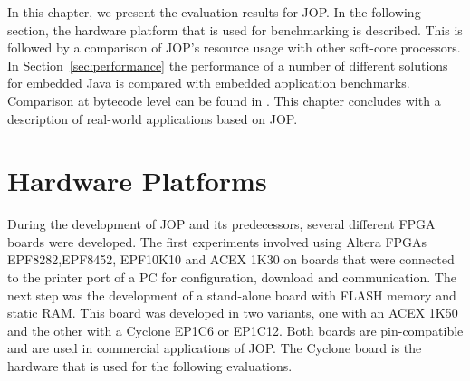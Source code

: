 
In this chapter, we present the evaluation results for JOP. In the
following section, the hardware platform that is used for
benchmarking is described. This is followed by a comparison of JOP's
resource usage with other soft-core processors. In
Section~\ref{sec:performance} the performance of a number of
different solutions for embedded Java is compared with embedded
application benchmarks. Comparison at bytecode level can be found in
\cite{jop:austrochip05}. This chapter concludes with a description of
real-world applications based on JOP.

\section{Hardware Platforms}

During the development of JOP and its predecessors, several
different FPGA boards were developed. The first experiments involved
using Altera FPGAs EPF8282,\linebreak[4] EPF8452, EPF10K10 and ACEX
1K30 on boards that were connected to the printer port of a PC for
configuration, download and communication. The next step was the
development of a stand-alone board with FLASH memory and static RAM.
This board was developed in two variants, one with an ACEX 1K50 and
the other with a Cyclone EP1C6 or EP1C12. Both boards are
pin-compatible and are used in commercial applications of JOP. The
Cyclone board is the hardware that is used for the following
evaluations.

